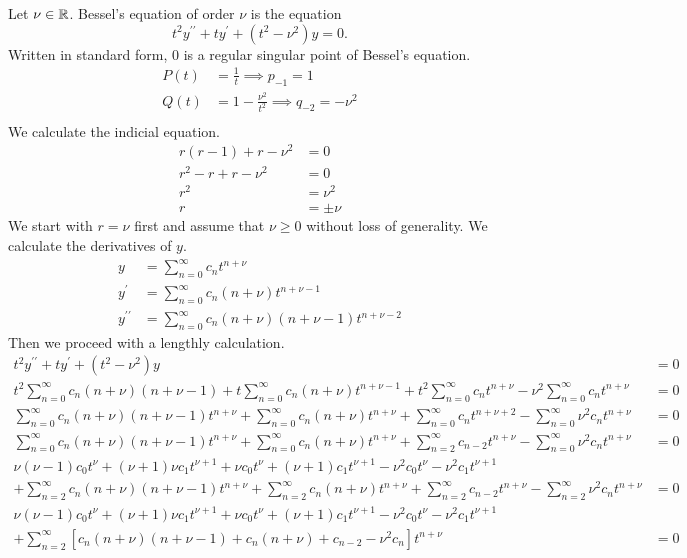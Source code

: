 \documentclass[fleqn,letterpaper]{report}
\begin{document}
Let $\nu \in \mathbb{R}$. Bessel's equation of order $\nu$ is the
equation
\begin{equation*}
t^2 y^{\prime \prime} + t y^\prime + (t^2 - \nu^2) y = 0.
\end{equation*}
Written in standard form, $0$ is a regular singular point of
Bessel's equation.
\begin{align*}
P(t) & = \frac{1}{t} \implies p_{-1} = 1 \\
Q(t) & = 1-\frac{\nu^2}{t^2} \implies q_{-2} = -\nu^2 \\
\end{align*}
We calculate the indicial equation.
\begin{align*}
r(r-1) + r - \nu^2 & = 0 \\
r^2 -r + r - \nu^2 & = 0 \\
r^2 & = \nu^2 \\
r & = \pm \nu
\end{align*}
We start with $r = \nu$ first and assume that $\nu \geq
0$ without loss of generality. We calculate the derivatives of
$y$.
\begin{align*}
y & = \sum_{n=0}^\infty c_n t^{n+\nu} \\
y^\prime & = \sum_{n=0}^\infty c_n(n+\nu) t^{n+\nu- 1} \\
y^{\prime\prime} & = \sum_{n=0}^\infty c_n(n+\nu)(n+\nu-1)
t^{n+\nu- 2} 
\end{align*}
Then we proceed with a lengthly calculation.
\begin{align*}
t^2 y^{\prime \prime} + t y^\prime + (t^2 - \nu^2) y & = 0 \\
t^2 \sum_{n=0}^\infty c_n(n+\nu)(n+\nu-1)
+ t \sum_{n=0}^\infty c_n(n+\nu) t^{n+\nu- 1} 
+ t^2 \sum_{n=0}^\infty c_n t^{n+\nu} 
- \nu^2 \sum_{n=0}^\infty c_n t^{n+\nu} & = 0 \\
\sum_{n=0}^\infty c_n(n+\nu)(n+\nu-1) t^{n+\nu} 
+ \sum_{n=0}^\infty c_n(n+\nu) t^{n+\nu} 
+ \sum_{n=0}^\infty c_n t^{n+\nu+2} 
- \sum_{n=0}^\infty \nu^2 c_n t^{n+\nu} & = 0 \\
\sum_{n=0}^\infty c_n(n+\nu)(n+\nu-1) t^{n+\nu} 
+ \sum_{n=0}^\infty c_n(n+\nu) t^{n+\nu} 
+ \sum_{n=2}^\infty c_{n-2} t^{n+\nu} 
- \sum_{n=0}^\infty \nu^2 c_n t^{n+\nu} & = 0 \\
\nu(\nu-1) c_0 t^\nu + (\nu+1) \nu c_1 t^{\nu+1} + \nu c_0 t^\nu
+ (\nu+1)c_1t^{\nu+1} - \nu^2 c_0 t^\nu - \nu^2 c_1 t^{\nu+1} & \\
+ \sum_{n=2}^\infty c_n(n+\nu)(n+\nu-1) t^{n+\nu} 
+ \sum_{n=2}^\infty c_n(n+\nu) t^{n+\nu} 
+ \sum_{n=2}^\infty c_{n-2} t^{n+\nu} 
- \sum_{n=2}^\infty \nu^2 c_n t^{n+\nu} & = 0 \\
\nu(\nu-1) c_0 t^\nu + (\nu+1) \nu c_1 t^{\nu+1} + \nu c_0 t^\nu
+ (\nu+1)c_1t^{\nu+1} - \nu^2 c_0 t^\nu - \nu^2 c_1 t^{\nu+1} & \\
+ \sum_{n=2}^\infty \left[ c_n(n+\nu)(n+\nu-1) 
+ c_n(n+\nu) + c_{n-2} - \nu^2 c_n \right] t^{n+\nu} & = 0 
\end{align*}
\end{document}
